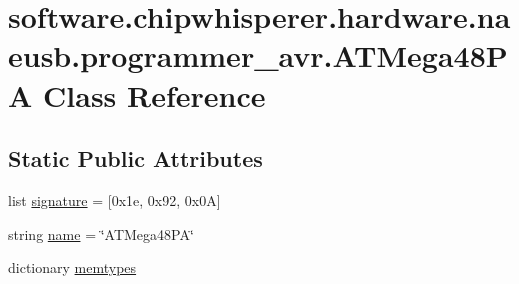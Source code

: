 \hypertarget{classsoftware_1_1chipwhisperer_1_1hardware_1_1naeusb_1_1programmer__avr_1_1ATMega48PA}{}\section{software.\+chipwhisperer.\+hardware.\+naeusb.\+programmer\+\_\+avr.\+A\+T\+Mega48\+P\+A Class Reference}
\label{classsoftware_1_1chipwhisperer_1_1hardware_1_1naeusb_1_1programmer__avr_1_1ATMega48PA}
\subsection*{Static Public Attributes}
\begin{DoxyCompactItemize}
\item 
list \hyperlink{classsoftware_1_1chipwhisperer_1_1hardware_1_1naeusb_1_1programmer__avr_1_1ATMega48PA_a86ccd541d3d0866f7fdebdd06a7b7073}{signature} = \mbox{[}0x1e, 0x92, 0x0\+A\mbox{]}
\item 
string \hyperlink{classsoftware_1_1chipwhisperer_1_1hardware_1_1naeusb_1_1programmer__avr_1_1ATMega48PA_ae2565c867bde822e661144b9e8c30441}{name} = \char`\"{}A\+T\+Mega48\+P\+A\char`\"{}
\item 
dictionary \hyperlink{classsoftware_1_1chipwhisperer_1_1hardware_1_1naeusb_1_1programmer__avr_1_1ATMega48PA_a74f7cbe034c5697d65208d25c9cd6b9b}{memtypes}
\end{DoxyCompactItemize}



